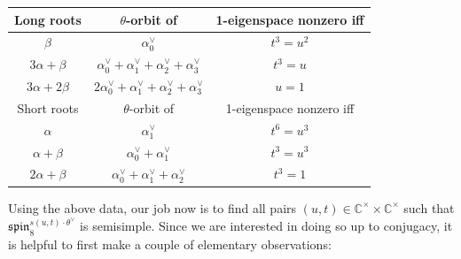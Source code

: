 \documentclass[11pt]{amsart}
\theoremstyle{plain}
\numberwithin{equation}{section}
\newcommand{\C}{\mathbb C}
\def\C{{\bf C}}
\def\C{{\mathbb C}}
\begin{document}
 
  
 
 
 

 \begin{center}
 \begin{tabular}{|c|c|c|}
  \hline
  Long roots &  $\theta$-orbit of & 1-eigenspace nonzero iff  \\
\hline  
  $\beta$ & $\alpha_0^\vee$ & $t^3 = u^2$ \\
\hline
 $3\alpha+ \beta$  & $\alpha_0^\vee+\alpha_1^\vee+\alpha_2^\vee+\alpha_3^\vee$ & $t^3 = u$ \\
 \hline
  $3 \alpha+2 \beta$ & $2\alpha_0^\vee+\alpha_1^\vee+\alpha_2^\vee+\alpha_3^\vee$ & $u=1$ \\ 
  \hline 
  \hline
   Short roots & $\theta$-orbit of & 1-eigenspace nonzero iff    \\
 \hline
   $\alpha$ & $\alpha_1^\vee$ & $t^6 = u^3$     \\
 \hline
  $\alpha+ \beta$  & $\alpha_0^\vee+\alpha_1^\vee$ & $t^3 = u^3$ \\
  \hline
 $2\alpha + \beta$ & $\alpha_0^\vee+\alpha_1^\vee+\alpha_2^\vee$ &  $t^3 =1$  \\
   \hline
 \end{tabular}
 \end{center} 
 \vskip 5pt
 
 
 Using the above data, our job now is to find all pairs $(u,t) \in \C^{\times} \times \C^{\times}$ such that $\mathfrak{spin}_8^{s(u,t) \cdot \theta^{\vee}}$ is  semisimple.
 Since we are interested in doing so up to conjugacy, it is helpful to first make a couple of elementary observations:
 \vskip 5pt
 
\end{document}
